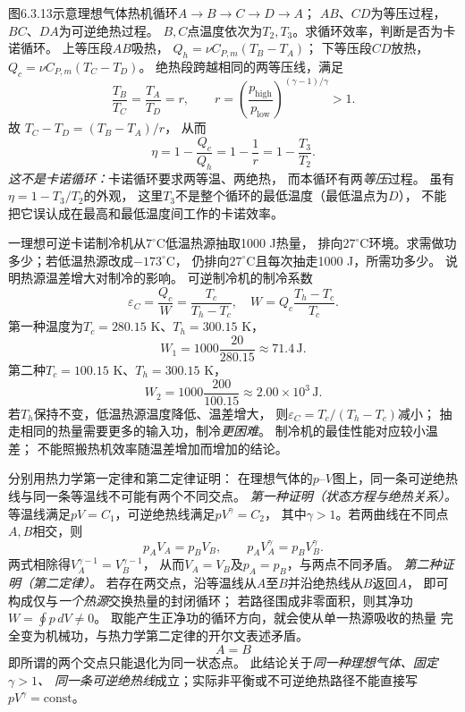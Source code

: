 \problemtext 图6.3.13示意理想气体热机循环$A\to B\to C\to D\to A$；
$AB$、$CD$为等压过程，$BC$、$DA$为可逆绝热过程。
$B,C$点温度依次为$T_2,T_3$。求循环效率，判断是否为卡诺循环。
\workings
上等压段$AB$吸热，
$Q_h=\nu C_{P,m}(T_B-T_A)$；
下等压段$CD$放热，$Q_c=\nu C_{P,m}(T_C-T_D)$。
绝热段跨越相同的两等压线，满足
\[
\frac{T_B}{T_C}=\frac{T_A}{T_D}=r,
\qquad r=
\left(\frac{p_{\mathrm{high}}}{p_{\mathrm{low}}}
\right)^{(\gamma-1)/\gamma}>1.
\]
故
$T_C-T_D=(T_B-T_A)/r$，
从而
\[
\boxed{\eta=1-\frac{Q_c}{Q_h}
=1-\frac1r=1-\frac{T_3}{T_2}}.
\]
\emph{这不是卡诺循环：}卡诺循环要求两等温、两绝热，
而本循环有两\emph{等压}过程。
\crosscheck 虽有$\eta=1-T_3/T_2$的外观，
这里$T_3$不是整个循环的最低温度（最低温点为$D$），
不能把它误认成在最高和最低温度间工作的卡诺效率。

\problemtext 一理想可逆卡诺制冷机从$7^\circ$C低温热源抽取1000 J热量，
排向$27^\circ$C环境。求需做功多少；若低温热源改成$-173^\circ$C，
仍排向$27^\circ$C且每次抽走1000 J，所需功多少。
说明热源温差增大对制冷的影响。
\workings
可逆制冷机的制冷系数
\[
\varepsilon_C=\frac{Q_c}{W}
=\frac{T_c}{T_h-T_c},
\quad
\boxed{W=Q_c\frac{T_h-T_c}{T_c}}.
\]
第一种温度为$T_c=280.15$ K、$T_h=300.15$ K，
\[
\boxed{W_1=1000\frac{20}{280.15}\approx71.4\,\mathrm J}.
\]
第二种$T_c=100.15$ K、$T_h=300.15$ K，
\[
\boxed{W_2=1000\frac{200}{100.15}
\approx2.00\times10^3\,\mathrm J}.
\]
若$T_h$保持不变，低温热源温度降低、温差增大，
则$\varepsilon_C=T_c/(T_h-T_c)$减小；
抽走相同的热量需要更多的输入功，制冷\emph{更困难}。
\crosscheck 制冷机的最佳性能对应较小温差；
不能照搬热机效率随温差增加而增加的结论。

\problemtext 分别用热力学第一定律和第二定律证明：
在理想气体的$p$--$V$图上，同一条可逆绝热线与同一条等温线不可能有两个不同交点。
\workings
\emph{第一种证明（状态方程与绝热关系）。}
等温线满足$pV=C_1$，可逆绝热线满足$pV^\gamma=C_2$，
其中$\gamma>1$。若两曲线在不同点$A,B$相交，则
\[
p_AV_A=p_BV_B,\qquad
p_AV_A^\gamma=p_BV_B^\gamma.
\]
两式相除得$V_A^{\gamma-1}=V_B^{\gamma-1}$，
从而$V_A=V_B$及$p_A=p_B$，与两点不同矛盾。
\emph{第二种证明（第二定律）。}
若存在两交点，沿等温线从$A$至$B$并沿绝热线从$B$返回$A$，
即可构成仅与\emph{一个热源}交换热量的封闭循环；
若路径围成非零面积，则其净功
$W=\oint p\,dV\ne0$。
取能产生正净功的循环方向，就会使从单一热源吸收的热量
完全变为机械功，与热力学第二定律的开尔文表述矛盾。
\[
\boxed{A=B}
\]
即所谓的两个交点只能退化为同一状态点。
\crosscheck 此结论关于\emph{同一种理想气体、固定$\gamma>1$、
同一条可逆绝热线}成立；实际非平衡或不可逆绝热路径不能直接写$pV^\gamma=\mathrm{const}$。

